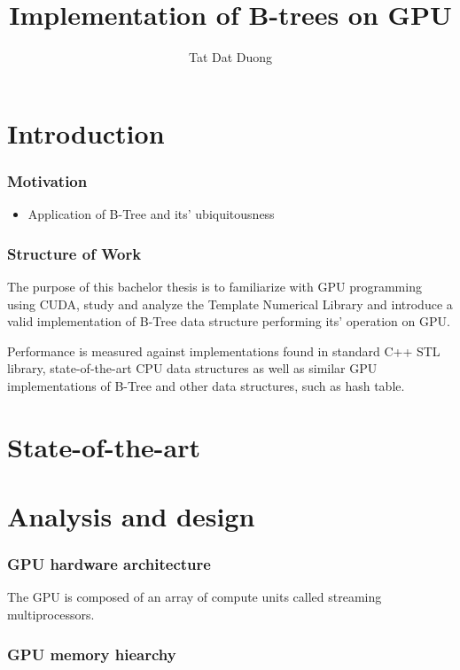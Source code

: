 \documentclass[thesis=B,english]{FITthesis}[2019/12/23]
\title{Implementation of B-trees on GPU}
\author{Tat Dat Duong} %
\begin{document}

\chapter{Introduction}

\subsection{Motivation}
\begin{itemize}
	\item Application of B-Tree and its' ubiquitousness
\end{itemize}

\subsection{Structure of Work}
The purpose of this bachelor thesis is to familiarize with GPU programming using CUDA, study and analyze the Template Numerical Library and introduce a valid implementation of B-Tree data structure performing its' operation on GPU.

Performance is measured against implementations found in standard C++ STL library, state-of-the-art CPU data structures as well as similar GPU implementations of B-Tree and other data structures, such as hash table.


\chapter{State-of-the-art}

\chapter{Analysis and design}

\subsection{GPU hardware architecture}

The GPU is composed of an array of compute units called streaming multiprocessors.

\subsection{GPU memory hiearchy}
\end{document}

